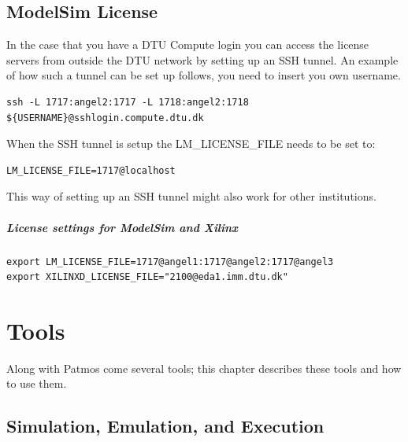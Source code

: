\documentclass[a4paper,fontsize=10pt,twoside,DIV15,BCOR12mm,headinclude=true,footinclude=false,pagesize,bibtotoc]{scrbook}
\newcommand{\code}[1]{{\texttt{#1}}}
\begin{document}


\section{ModelSim License}
In the case that you have a DTU Compute login you can access the license servers from outside the DTU network by setting up an SSH tunnel.
An example of how such a tunnel can be set up follows, you need to insert you own username.

\begin{verbatim}
ssh -L 1717:angel2:1717 -L 1718:angel2:1718 ${USERNAME}@sshlogin.compute.dtu.dk
\end{verbatim}

When the SSH tunnel is setup the LM\_LICENSE\_FILE needs to be set to:
\begin{verbatim}
LM_LICENSE_FILE=1717@localhost
\end{verbatim}

This way of setting up an SSH tunnel might also work for other institutions.

\paragraph{License settings for ModelSim and Xilinx}

\begin{verbatim}
export LM_LICENSE_FILE=1717@angel1:1717@angel2:1717@angel3
export XILINXD_LICENSE_FILE="2100@eda1.imm.dtu.dk"
\end{verbatim}





\chapter{Tools}

Along with Patmos come several tools; this chapter describes these
tools and how to use them.

\section{Simulation, Emulation, and Execution}
\end{document}

